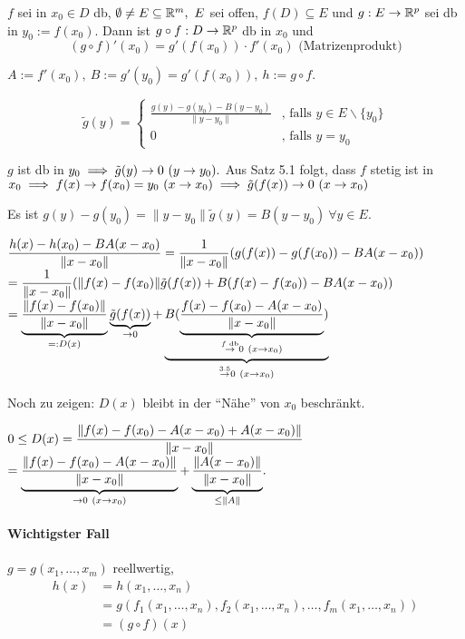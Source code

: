 \documentclass[a4paper,twoside,DIV15,BCOR12mm,chapterprefix=true,headings=twolinechapter]{scrbook}
\begin{document}
\begin{satz}[Kettenregel]
$f$ sei in $x_0 \in D$ db, $\emptyset \ne E \subseteq \MdR^m,\ E$ sei offen, $f(D) \subseteq E$ und $g:E \to \mathbb{R}^p$ sei db in $y_0 := f(x_0)$. Dann ist $g \circ f: D \to \mathbb{R}^p$ db in $x_0$ und $$(g \circ f)'(x_0) = g'(f(x_0))\cdot f'(x_0)\text{ (Matrizenprodukt)}$$
\end{satz}

\begin{beweis}
$A := f'(x_0),\ B := g'(y_0) = g'(f(x_0)),\ h := g \circ f.$

$$\tilde{g}(y) = \begin{cases}
\frac{g(y)-g(y_0)-B(y-y_0)}{\|y-y_0\|} & \text{, falls } y \in E\backslash\{y_0\} \\
0                                      & \text{, falls } y = y_0
\end{cases}$$

$g$ ist db in $y_0 \implies \tilde{g}(y) \to 0\ (y \to y_0).$ Aus Satz 5.1 folgt, dass $f$ stetig ist in $x_0 \implies f(x) \to f(x_0) = y_0\ (x \to x_0) \implies \tilde{g}(f(x)) \to 0\ (x \to x_0)$

Es ist $g(y) - g(y_0) = \|y-y_0\| \tilde{g}(y) = B(y-y_0)\ \forall y \in E.$

$\displaystyle{\frac{h(x)-h(x_0)-BA(x-x_0)}{\|x-x_0\|} = \frac{1}{\|x-x_0\|}(g(f(x))-g(f(x_0))-BA(x-x_0))}$\\
$\displaystyle{= \frac{1}{\|x-x_0\|} (\|f(x)-f(x_0)\| \tilde{g}(f(x)) + B(f(x)-f(x_0))-BA(x-x_0))}$\\
$\displaystyle{= \underbrace{\frac{\|f(x)-f(x_0)\|}{\|x-x_0\|}}_{=:D(x)} \underbrace{\tilde{g}(f(x))}_{\to 0} + \underbrace{B(\underbrace{\frac{f(x)-f(x_0)-A(x-x_0)}{\|x-x_0\|}}_{\overset{f\text{ db}}{\to} 0\ (x \to x_0)})}_{\overset{\text{3.5}}{\to} 0\ (x \to x_0)}}$

Noch zu zeigen: $D(x)$ bleibt in der "`Nähe"' von $x_0$ beschränkt.

$0 \le D(x) = \displaystyle{\frac{\|f(x)-f(x_0)-A(x-x_0)+A(x-x_0)\|}{\|x-x_0\|}}$\\
$\displaystyle{= \underbrace{\frac{\|f(x)-f(x_0)-A(x-x_0)\|}{\|x-x_0\|}}_{\to 0\ (x \to x_0)} + \underbrace{\frac{\|A(x-x_0)\|}{\|x-x_0\|}}_{\le \|A\|}}.$
\end{beweis}

\paragraph{Wichtigster Fall} 
$g = g(x_1,\ldots,x_m)$ reellwertig, 
\begin{align*}
h(x) &= h(x_1,\ldots,x_n) \\
&= g(f_1(x_1,\ldots,x_n),f_2(x_1,\ldots,x_n),\ldots,f_m(x_1,\ldots,x_n)) \\
&= (g \circ f)(x)
\end{align*}
\end{document}
